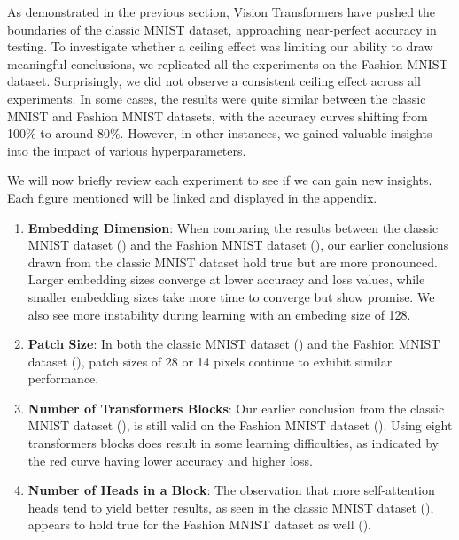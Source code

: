 As demonstrated in the previous section, Vision Transformers have pushed the boundaries of the classic MNIST dataset, approaching near-perfect accuracy in testing. To investigate whether a ceiling effect was limiting our ability to draw meaningful conclusions, we replicated all the experiments on the Fashion MNIST dataset. Surprisingly, we did not observe a consistent ceiling effect across all experiments. In some cases, the results were quite similar between the classic MNIST and Fashion MNIST datasets, with the accuracy curves shifting from 100\% to around 80\%. However, in other instances, we gained valuable insights into the impact of various hyperparameters.

We will now briefly review each experiment to see if we can gain new insights. Each figure mentioned will be linked and displayed in the appendix.
\begin{enumerate}
    \item \textbf{Embedding Dimension}: When comparing the results between the classic MNIST dataset () and the Fashion MNIST dataset (), our earlier conclusions drawn from the classic MNIST dataset hold true but are more pronounced. Larger embedding sizes converge at lower accuracy and loss values, while smaller embedding sizes take more time to converge but show promise. We also see more instability during learning with an embeding size of 128.

    \item \textbf{Patch Size}: In both the classic MNIST dataset () and the Fashion MNIST dataset (), patch sizes of 28 or 14 pixels continue to exhibit similar performance. 

    \item \textbf{Number of Transformers Blocks}: Our earlier conclusion from the classic MNIST dataset (), is still valid on the Fashion MNIST dataset (). Using eight transformers blocks does result in some learning difficulties, as indicated by the red curve having lower accuracy and higher loss.

    \item \textbf{Number of Heads in a Block}: The observation that more self-attention heads tend to yield better results, as seen in the classic MNIST dataset (), appears to hold true for the Fashion MNIST dataset as well ().


\end{enumerate}
